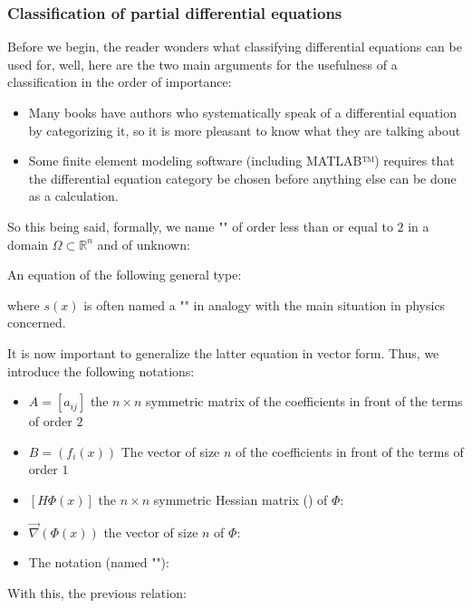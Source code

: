 	\pagebreak
	\subsubsection{Classification of partial differential equations}
	Before we begin, the reader wonders what classifying differential equations can be used for, well, here are the two main arguments for the usefulness of a classification in the order of importance:
	\begin{itemize}
		\item Many books have authors who systematically speak of a differential equation by categorizing it, so it is more pleasant to know what they are talking about

		\item Some finite element modeling software (including MATLAB™) requires that the differential equation category be chosen before anything else can be done as a calculation.
	\end{itemize}
	So this being said, formally, we name "" of order less than or equal to $2$ in a domain $\Omega \subset \mathbb{R}^n$ and of unknown:
	
	An equation of the following general type:
	
 	where $s(x)$ is often named a "" in analogy with the main situation in physics concerned.

	It is now important to generalize the latter equation in vector form. Thus, we introduce the following notations:
	\begin{itemize}
		\item $A=[a_{ij}]$ the $n\times n$ symmetric matrix of the coefficients in front of the terms of order $2$

		\item $B=(f_i(x))$ The vector of size $n$ of the coefficients in front of the terms of order $1$

		\item $[H\Phi(x)]$ the $n\times n$ symmetric Hessian matrix () of $\Phi$:
		

		\item $\vec{\nabla}(\Phi(x))$ the vector of size $n$ of $\Phi$:
		

		\item The notation (named ""):
		
	\end{itemize}
	With this, the previous relation:
	

